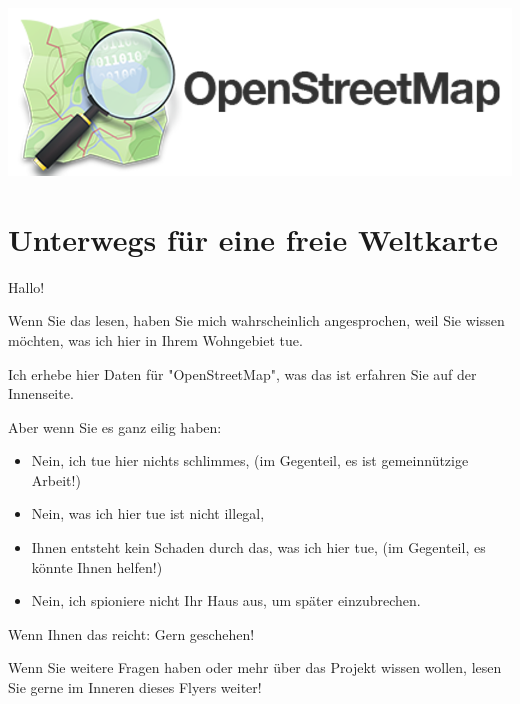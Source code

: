 \documentclass[10pt,foldmark,notumble]{leaflet}
\begin{document}
    \includegraphics[width=\linewidth]{logo.png}

    \section{Unterwegs für eine freie Weltkarte}
    Hallo!

    Wenn Sie das lesen, haben Sie mich wahrscheinlich angesprochen, weil Sie wissen möchten, was ich hier in Ihrem Wohngebiet tue.

    Ich erhebe hier Daten für "OpenStreetMap", was das ist erfahren Sie auf der Innenseite.

    Aber wenn Sie es ganz eilig haben:
    \begin{itemize}[noitemsep,topsep=0pt]
        \item Nein, ich tue hier nichts schlimmes, {\small(im Gegenteil, es ist gemeinnützige Arbeit!)}
        \item Nein, was ich hier tue ist nicht illegal,
        \item Ihnen entsteht kein Schaden durch das, was ich hier tue, {\small(im Gegenteil, es könnte Ihnen helfen!)}
        \item Nein, ich spioniere nicht Ihr Haus aus, um später einzubrechen.
    \end{itemize}

    Wenn Ihnen das reicht: Gern geschehen!

    Wenn Sie weitere Fragen haben oder mehr über das Projekt wissen wollen, lesen Sie gerne im Inneren dieses Flyers weiter!
\end{document}

